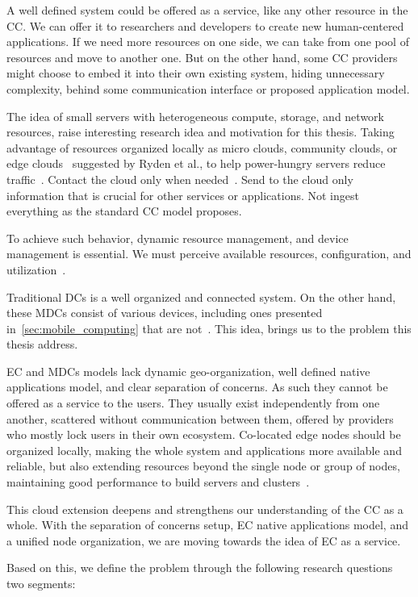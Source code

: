 A well defined system could be offered as a service, like any other resource in the CC. We can offer it to researchers and developers to create new human-centered applications. If we need more resources on one side, we can take from one pool of resources and move to another one.
But on the other hand, some CC providers might choose to embed it into their own existing system, hiding unnecessary complexity, behind some communication interface or proposed application model.

The idea of small servers with heterogeneous compute, storage, and network resources, raise interesting research idea and motivation for this thesis. Taking advantage of resources organized locally as micro clouds, community clouds, or edge clouds~\cite{RydenOCW14} suggested by Ryden et al., to help power-hungry servers reduce traffic~\cite{HirschMZ18}. Contact the cloud only when needed~\cite{inproceedingsSimic1}. Send to the cloud only information that is crucial for other services or applications. Not ingest everything as the standard CC model proposes.

To achieve such behavior, dynamic resource management, and device management is essential. We must perceive available resources, configuration, and utilization~\cite{GubbiBMP13, WangZZWYW17}.

Traditional DCs is a well organized and connected system. On the other hand, these MDCs consist of various devices, including ones presented in~\ref{sec:mobile_computing} that are not~\cite{JiangCGZW19}. This idea, brings us to the problem this thesis address.

EC and MDCs models lack dynamic geo-organization, well defined native applications model, and clear separation of concerns. As such they cannot be offered as a service to the users. They usually exist independently from one another, scattered without communication between them, offered by providers who mostly lock users in their own ecosystem. Co-located edge nodes should be organized locally, making the whole system and applications more available and reliable, but also extending resources beyond the single node or group of nodes, maintaining good performance to build servers and clusters~\cite{ArocaG12}.

This cloud extension deepens and strengthens our understanding of the CC as a whole. With the separation of concerns setup, EC native applications model, and a unified node organization, we are moving towards the idea of EC as a service. 

Based on this, we define the problem through the following research questions two segments:

